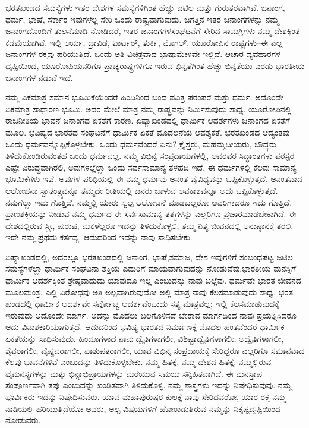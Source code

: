 ಭರತಖಂಡದ ಸಮಸ್ಯೆಗಳು ಇತರ ದೇಶಗಳ ಸಮಸ್ಯೆಗಳಿಗಿಂತ ಹೆಚ್ಚು ಜಟಿಲ ಮತ್ತು ಗುರುತರವಾಗಿವೆ. ಜನಾಂಗ, ಧರ್ಮ, ಭಾಷೆ, ಸರ್ಕಾರ ಇವುಗಳೆಲ್ಲ ಸೇರಿ ಒಂದು ರಾಷ್ಟ್ರವಾಗುವುದು. ಜಗತ್ತಿನ ಇತರ ಜನಾಂಗಗಳನ್ನು ನಮ್ಮ ಜನಾಂಗದೊಂದಿಗೆ ತುಲನೆಮಾಡಿ ನೋಡಿದರೆ, ಇತರ ಜನಾಂಗಗಳ\break ಸಂಘಟನೆಗೆ ಸೇರಿದ ಸಾಮಗ್ರಿಗಳು ನಮ್ಮ ದೇಶಕ್ಕಿಂತ ಕಡಮೆಯಾಗಿವೆ. ಇಲ್ಲಿ ಆರ್ಯ, ದ್ರಾವಿಡ, ಟಾರ್ಟರ್​, ತುರ್ಕಿ, ಮೊಗಲ್​, ಯೂರೋಪಿನ ರಾಷ್ಟ್ರಗಳು–ಈ ಎಲ್ಲ ಜನಾಂಗಗಳ ರಕ್ತವು ಹರಿಯುತ್ತಿದೆ. ಒಂದು ಅತಿ ವಿಚಿತ್ರವಾದ ಭಾಷಾಮೇಳವೇ ಇಲ್ಲಿದೆ. ಆಚಾರ ವ್ಯವಹಾರಗಳ ದೃಷ್ಟಿಯಿಂದ, ಯೂರೋಪಿಯನರಿಗೂ ಪ್ರಾಚ್ಯರಾಷ್ಟ್ರಗಳಿಗೂ ಇರುವ ಭಿನ್ನತೆಗಿಂತ ಹೆಚ್ಚು ಭಿನ್ನತೆಯು ಎರಡು ಭಾರತೀಯ ಜನಾಂಗಗಳ ನಡುವೆ ಇದೆ.

ನಮ್ಮ ಏಕಮಾತ್ರ ಸಮಾನ ಭೂಮಿಕೆಯೆಂದರೆ ಹಿಂದಿನಿಂದ ಬಂದ ಪವಿತ್ರ ಪರಂಪರೆ ಮತ್ತು ಧರ್ಮ. ಅದೊಂದೇ ಏಕಮಾತ್ರ ಸಾಧಾರಣ ಭೂಮಿ. ಅದರ ಮೇಲೆ ಮಾತ್ರ ನಮ್ಮ ರಾಷ್ಟ್ರವನ್ನು ನಿರ್ಮಿಸುವುದು ಸಾಧ್ಯ. ಯೂರೋಪಿನಲ್ಲಿ ರಾಜನೀತಿಯ ಭಾವನೆ ಜನಾಂಗದ ಏಕತೆಗೆ ಕಾರಣ. ಏಷ್ಯಾಖಂಡದಲ್ಲಿ ಧಾರ್ಮಿಕ ಆದರ್ಶಗಳು ಜನಾಂಗದ ಏಕತೆಗೆ ಮೂಲ. ಭವಿಷ್ಯದ ಭಾರತದ ಸಂಘಟನೆಗೆ ಧಾರ್ಮಿಕ ಏಕತೆ ಮೊದಲನೆಯ ಆವಶ್ಯಕತೆ. ಭರತಖಂಡದ ಆದ್ಯಂತವು ಒಂದು ಧರ್ಮವನ್ನೊಪ್ಪಿಕೊಳ್ಳಬೇಕು. ಒಂದು ಧರ್ಮವೆಂದರೆ ಏನು? ಕ್ರೈಸ್ತರು, ಮಹಮ್ಮದೀಯರು, ಬೌದ್ಧರು ತಿಳಿದುಕೊಂಡಿರುವಂತಹ ಒಂದು ಧರ್ಮವಲ್ಲ. ನಮ್ಮ ವಿಭಿನ್ನ ಸಂಪ್ರದಾಯಗಳಲ್ಲಿ, ಅವರವರ ಸಿದ್ಧಾಂತಗಳು ಪರಸ್ಪರ ಎಷ್ಟೇ ವಿರುದ್ಧವಾಗಿರಲಿ, ಅವುಗಳಲ್ಲೆಲ್ಲಾ ಒಂದು ಸರ್ವಸಾಮಾನ್ಯ ತಳಹದಿ ಇದೆ. ಈ ಧರ್ಮಗಳಲ್ಲಿ ಕೆಲವು ಸಾಮಾನ್ಯ ಭೂಮಿಕೆಗಳು ಇವೆ. ಅವುಗಳ ಪರಿಧಿಯಲ್ಲಿ ಈ ನಮ್ಮ ಧರ್ಮವು ಅನಂತ ವೈವಿಧ್ಯವನ್ನು ಒಪ್ಪಿಕೊಳ್ಳುತ್ತದೆ. ಅನಂತವಾದ ಆಲೋಚನಾ ಸ್ವಾತಂತ್ರ್ಯವನ್ನೂ ತಮ್ಮದೇ ರೀತಿಯಲ್ಲಿ ಜನರು ಬಾಳುವ ಅವಕಾಶವನ್ನೂ ಅದು ಒಪ್ಪಿಕೊಳ್ಳುತ್ತದೆ. ನಮಗೆಲ್ಲಾ ಇದು ಗೊತ್ತಿದೆ. ನಮ್ಮಲ್ಲಿ ಯಾರು ಸ್ವಲ್ಪ ಆಲೋಚನೆ ಮಾಡಬಲ್ಲರೋ ಅವರಿಗಾದರೂ ಇದು ಗೊತ್ತಿದೆ. ಪ್ರಾಣಶಕ್ತಿಯನ್ನು ನೀಡುವ ನಮ್ಮ ಧರ್ಮದ ಈ ಸರ್ವಸಾಮಾನ್ಯ ತತ್ತ್ವಗಳನ್ನು ಎಲ್ಲರಿಗೂ ಪ್ರಚಾರಮಾಡಬೇಕಾಗಿದೆ. ಈ ದೇಶದಲ್ಲಿರುವ ಸ್ತ್ರೀ, ಪುರುಷ, ಮಕ್ಕಳೆಲ್ಲರೂ ಇದನ್ನು ತಿಳಿದುಕೊಳ್ಳಲಿ, ತಮ್ಮ ನಿತ್ಯ ಜೀವನದಲ್ಲಿ ಅನುಷ್ಠಾನಕ್ಕೆ ತರಲಿ. ಇದೇ ನಮ್ಮ ಪ್ರಥಮ ಕರ್ತವ್ಯ. ಆದುದರಿಂದ ಇದನ್ನು ನಾವು ಸಾಧಿಸಬೇಕು.

ಏಷ್ಯಾಖಂಡದಲ್ಲಿ, ಅದರಲ್ಲೂ ಭರತಖಂಡದಲ್ಲಿ ಜನಾಂಗ, ಭಾಷೆ,\break ಸಮಾಜ, ದೇಶ ಇವುಗಳಿಗೆ ಸಂಬಂಧಪಟ್ಟ ಜಟಿಲ ಸಮಸ್ಯೆಗಳೆಲ್ಲಾ ಧಾರ್ಮಿಕ ಸಂಘಟನಾ ಶಕ್ತಿಯ ಎದುರಿಗೆ ಮಾಯವಾಗುವುದನ್ನು ನೋಡುವೆವು.\break ಭಾರತೀಯ ಮನಸ್ಸಿಗೆ ಧಾರ್ಮಿಕ ಆದರ್ಶಕ್ಕಿಂತ ಶ್ರೇಷ್ಠವಾದುದು ಯಾವುದೂ ಇಲ್ಲ ಎಂಬುದನ್ನು ನಾವು ಬಲ್ಲೆವು. ಧರ್ಮವೇ ಭಾರತ ಜೀವನದ ಮೂಲಮಂತ್ರ. ಎಲ್ಲಿ ವಿರೋಧವು ಅತಿ ಅಲ್ಪವಾಗಿರುವುದೋ ಅಲ್ಲಿ ಮಾತ್ರ ನಾವು ಕೆಲಸಮಾಡುವುದು ಸಾಧ್ಯ. ಭರತ ಖಂಡದಲ್ಲಿ ಧಾರ್ಮಿಕ ಆದರ್ಶವೇ ಸರ್ವೋಚ್ಚ ಆದರ್ಶವೆಂಬುದು ಸತ್ಯ ಮಾತ್ರವಲ್ಲ; ಇಲ್ಲಿ ಕೆಲಸಮಾಡುವುದಕ್ಕೆ ಇರುವುದು ಅದೊಂದೇ ಮಾರ್ಗ. ಅದನ್ನು ಮೊದಲು ಬಲಗೊಳಿಸದೆ ಬೇರಾವ ಮಾರ್ಗದಿಂದ ನಾವು ಪ್ರಯತ್ನಿಸಿದರೂ ಅದು ವಿನಾಶಕಾರಿಯಾಗುತ್ತದೆ. ಆದುದರಿಂದ ಭವಿಷ್ಯ ಭಾರತದ ನಿರ್ಮಾಣಕ್ಕೆ ಮೊದಲ ಹಂತವೆಂದರೆ ಧಾರ್ಮಿಕ ಏಕತೆಯನ್ನು ಸಾಧಿಸುವುದು. ಹಿಂದೂಗಳಾದ ನಾವು ದ್ವೈತಿಗಳಾಗಲೀ, ವಿಶಿಷ್ಟಾದ್ವೈತಿಗಳಾಗಲೀ, ಅದ್ವೈತಿಗಳಾಗಲೀ, ಶೈವರಾಗಲೀ, ವೈಷ್ಣವರಾಗಲೀ, ಪಾಶುಪತರಾಗಲೀ, ಯಾವ ವಿಭಿನ್ನ ಸಂಪ್ರದಾಯಕ್ಕೆ ಸೇರಿದ್ದರೂ ಎಲ್ಲರಿಗೂ ಸಮಾನವಾದ ಕೆಲವು ಭಾವನೆಗಳಿವೆ ಎಂಬುದನ್ನು ತಿಳಿದುಕೊಳ್ಳಬೇಕು. ನಮ್ಮ ಹಿತಕ್ಕೆ, ನಮ್ಮ ದೇಶದ ಹಿತಕ್ಕೆ, ನಮ್ಮಲ್ಲಿರುವ ವೈಮನಸ್ಯಗಳನ್ನು ಮತ್ತು ಭಿನ್ನಾಭಿಪ್ರಾಯಗಳನ್ನು ಮರೆಯುವ ಸಮಯ ಸನ್ನಿಹಿತವಾಗಿದೆ. ಈ ಮನಸ್ತಾಪ ಸಂಪೂರ್ಣವಾಗಿ ತಪ್ಪು ಎಂಬುದನ್ನು ಖಂಡಿತವಾಗಿ ತಿಳಿದುಕೊಳ್ಳಿ. ನಮ್ಮ ಶಾಸ್ತ್ರಗಳು ಇದನ್ನು ನಿಷೇಧಿಸುವುವು. ನಮ್ಮ ಪೂರ್ವಿಕರು ಇದನ್ನು ನಿಷೇಧಿಸುವರು. ಯಾವ ಮಹಾಪುರುಷರ ಕುಲಕ್ಕೆ ನಾವು ಸೇರಿದವರೋ, ಯಾರ ರಕ್ತ ನಮ್ಮ ನಾಡಿಯಲ್ಲಿ ಹರಿಯುತ್ತಿದೆಯೋ ಅವರು, ಅಲ್ಪ ವಿಷಯಗಳಿಗೆ ಹೋರಾಡುತ್ತಿರುವ ನಮ್ಮನ್ನು ನಿಕೃಷ್ಟದೃಷ್ಟಿಯಿಂದ ನೋಡುವರು.

